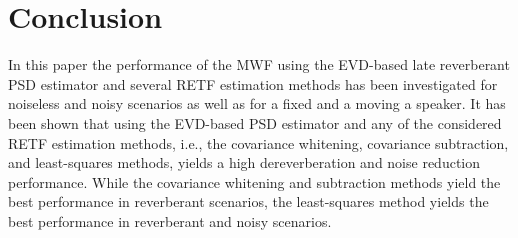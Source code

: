 \documentclass{article}
\begin{document}
\section{Conclusion}
In this paper the performance of the MWF using the EVD-based late reverberant PSD estimator and several RETF estimation methods has been investigated for noiseless and noisy scenarios as well as for a fixed and a moving a speaker.
It has been shown that using the EVD-based PSD estimator and any of the considered RETF estimation methods, i.e., the covariance whitening, covariance subtraction, and least-squares methods, yields a high dereverberation and noise reduction performance.
While the covariance whitening and subtraction methods yield the best performance in reverberant scenarios, the least-squares method yields the best performance in reverberant and noisy scenarios.


\end{document}
